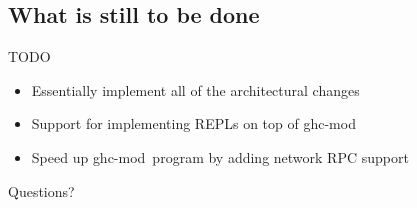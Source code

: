 \documentclass{beamer}
\newcommand\gm{{\Rokkitt ghc-mod}\ }
\begin{document}
\subsection{What is still to be done}

\begin{frame}{TODO}
  \begin{itemize}
  \item Essentially implement all of the architectural changes
  \item Support for implementing REPLs on top of ghc-mod
  \item Speed up \gm program by adding network RPC support
  \end{itemize}
\end{frame}

\begin{frame}{Questions?}
\end{frame}
\end{document}
